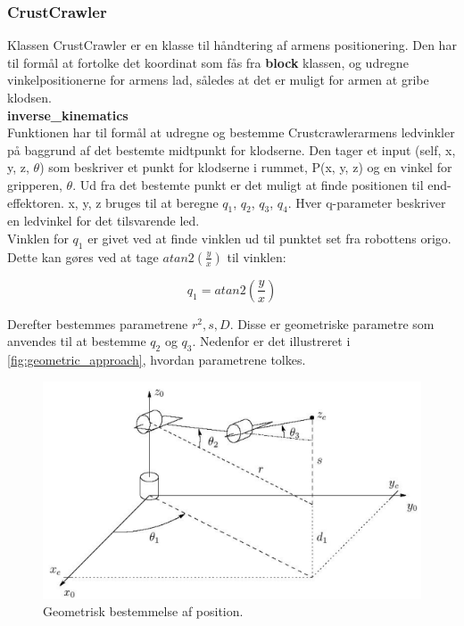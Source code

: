 \subsubsection{CrustCrawler}
\label{subsub: CrustCrawler}

Klassen CrustCrawler er en klasse til håndtering af armens positionering. Den har til formål at fortolke det koordinat som fås fra \textbf{block} klassen, og udregne vinkelpositionerne for armens lad, således at det er muligt for armen at gribe klodsen.\\

\textbf{inverse\_kinematics}\\
Funktionen har til formål at udregne og bestemme Crustcrawlerarmens ledvinkler på baggrund af det bestemte midtpunkt for klodserne. Den tager et input (self, x, y, z, $\theta$) som beskriver et punkt for klodserne i rummet, P(x, y, z) og en vinkel for gripperen, $\theta$. Ud fra det bestemte punkt er det muligt at finde positionen til end-effektoren. x, y, z bruges til at beregne $q_1$, $q_2$, $q_3$, $q_4$. Hver q-parameter beskriver en ledvinkel for det tilsvarende led.\\

Vinklen for $q_1$ er givet ved at finde vinklen ud til punktet set fra robottens origo. Dette kan gøres ved at tage $atan2(\frac{y}{x})$ til vinklen:

\begin{equation}
q_1 = atan2(\frac{y}{x})
\end{equation}

Derefter bestemmes parametrene $r^2, s, D$. Disse er geometriske parametre som anvendes til at bestemme $q_2$ og $q_3$. Nedenfor er det illustreret i \autoref{fig:geometric_approach}, hvordan parametrene tolkes.\\

\begin{figure}[h]
\centering
\includegraphics[scale=0.4]{images/geometric_approach}
\caption{Geometrisk bestemmelse af position.}
\label{fig:geometric_approach}
\end{figure}

